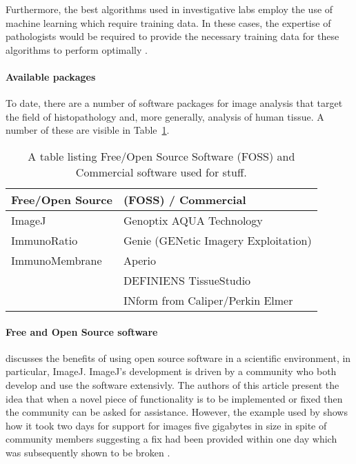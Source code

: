 \documentclass[12pt]{article}
\begin{document}
Furthermore, the best algorithms used in investigative labs employ the use of machine learning which require training 
data. In these cases, the expertise of pathologists would be required to provide the necessary training data for these 
algorithms to perform optimally \parencite{webster2014whole}.

\paragraph{Available packages}
To date, there are a number of software packages for image analysis that target the field of histopathology and, more 
generally, analysis of human tissue. A number of these are visible in Table~\ref{tab:software}.

\begin{table}
\label{tab:software}
\caption{A table listing Free/Open Source Software (FOSS) and Commercial software used for stuff.}
\begin{tabular}{|  l | l |}
	\hline
	Free/Open Source & (FOSS) / Commercial \\ \hline
	ImageJ & Genoptix AQUA Technology \\
	ImmunoRatio & Genie (GENetic Imagery Exploitation) \\
	ImmunoMembrane & Aperio \\
	& DEFINIENS TissueStudio \\
	& INform from Caliper/Perkin Elmer \\ \hline
\end{tabular}

\end{table}

\paragraph{Free and Open Source software}
\citeauthor{abramoff2004image} discusses the benefits of using open source software in a scientific environment, in 
particular, ImageJ. ImageJ's development is driven by a community who both develop and use the software extensivly. The 
authors of this article present the idea that when a novel piece of functionality is to be implemented or fixed then the 
community can be asked for assistance. However, the example used by \citeauthor{abramoff2004image} shows how 
it took two days for support for images five gigabytes in size in spite of community members suggesting a fix had been 
provided within one day which was subsequently shown to be broken \parencite{abramoff2004image}.
\end{document}
